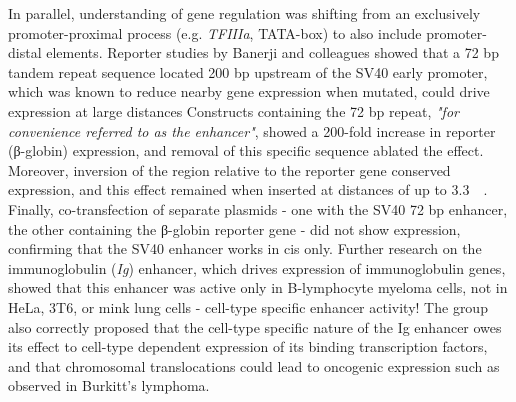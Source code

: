 In parallel, understanding of gene regulation was shifting from an exclusively promoter-proximal process (e.g. \textit{TFIIIa}, TATA-box) to also include promoter-distal elements. Reporter studies by Banerji and colleagues showed that a 72 bp tandem repeat sequence located 200 bp upstream of the SV40 early promoter, which was known to reduce nearby gene expression when mutated, could drive expression at large distances Constructs containing the 72 bp repeat, \textit{"for convenience referred to as the enhancer"}, showed a 200-fold increase in reporter ({\greekfont β}-globin) expression, and removal of this specific sequence ablated the effect. Moreover, inversion of the region relative to the reporter gene conserved expression, and this effect remained when inserted at distances of up to \SI{3.3}{\kilo\base}. Finally, co-transfection of separate plasmids - one with the SV40 72 bp enhancer, the other containing the {\greekfont β}-globin reporter gene - did not show expression, confirming that the SV40 enhancer works in cis only. Further research on the immunoglobulin (\textit{Ig}) enhancer, which drives expression of immunoglobulin genes, showed that this enhancer was active only in B-lymphocyte myeloma cells, not in HeLa, 3T6, or mink lung cells - cell-type specific enhancer activity! The group also correctly proposed that the cell-type specific nature of the Ig enhancer owes its effect to cell-type dependent expression of its binding transcription factors, and that chromosomal translocations could lead to oncogenic expression such as observed in Burkitt's lymphoma.

